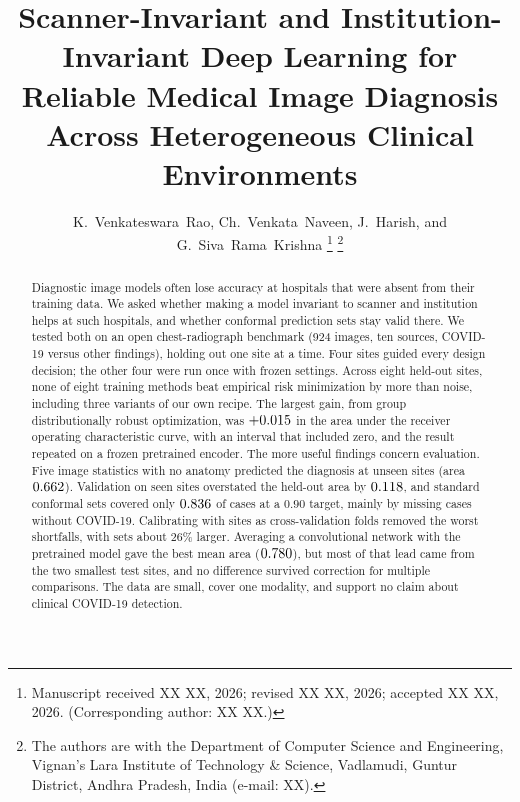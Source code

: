 \documentclass[journal]{IEEEtran}
\begin{document}

\title{Scanner-Invariant and Institution-Invariant Deep Learning for Reliable Medical Image Diagnosis Across Heterogeneous Clinical Environments}

\author{K.~Venkateswara~Rao, Ch.~Venkata~Naveen, J.~Harish, and G.~Siva~Rama~Krishna%
\thanks{Manuscript received XX XX, 2026; revised XX XX, 2026; accepted XX XX, 2026. (Corresponding author: XX XX.)}%
\thanks{The authors are with the Department of Computer Science and Engineering, Vignan's Lara Institute of Technology \& Science, Vadlamudi, Guntur District, Andhra Pradesh, India (e-mail: XX).}}


\maketitle

\begin{abstract}
Diagnostic image models often lose accuracy at hospitals that were absent from their training data. We asked whether making a model invariant to scanner and institution helps at such hospitals, and whether conformal prediction sets stay valid there. We tested both on an open chest-radiograph benchmark (924 images, ten sources, COVID-19 versus other findings), holding out one site at a time. Four sites guided every design decision; the other four were run once with frozen settings. Across eight held-out sites, none of eight training methods beat empirical risk minimization by more than noise, including three variants of our own recipe. The largest gain, from group distributionally robust optimization, was $+0.015$ in the area under the receiver operating characteristic curve, with an interval that included zero, and the result repeated on a frozen pretrained encoder. The more useful findings concern evaluation. Five image statistics with no anatomy predicted the diagnosis at unseen sites (area $0.662$). Validation on seen sites overstated the held-out area by $0.118$, and standard conformal sets covered only $0.836$ of cases at a $0.90$ target, mainly by missing cases without COVID-19. Calibrating with sites as cross-validation folds removed the worst shortfalls, with sets about $26\%$ larger. Averaging a convolutional network with the pretrained model gave the best mean area ($0.780$), but most of that lead came from the two smallest test sites, and no difference survived correction for multiple comparisons. The data are small, cover one modality, and support no claim about clinical COVID-19 detection.
\end{abstract}
\end{document}
